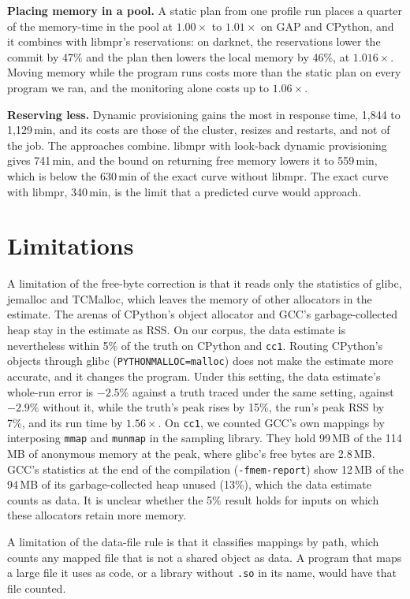 \documentclass[11pt]{article}
\begin{document}
\textbf{Placing memory in a pool.} A static plan from one profile run places a quarter of the memory-time in the pool
at $1.00\times$ to $1.01\times$ on GAP and CPython, and it combines with libmpr's reservations: on darknet, the
reservations lower the commit by 47\% and the plan then lowers the local memory by 46\%, at $1.016\times$. Moving
memory while the program runs costs more than the static plan on every program we ran, and the monitoring alone costs
up to $1.06\times$.

\textbf{Reserving less.} Dynamic provisioning gains the most in response time, 1{,}844 to 1{,}129\,min, and its
costs are those of the cluster, resizes and restarts, and not of the job. The approaches combine. libmpr with
look-back dynamic provisioning gives 741\,min, and the bound on returning free memory lowers it to 559\,min, which is
below the 630\,min of the exact curve without libmpr. The exact curve with libmpr, 340\,min, is the limit that a
predicted curve would approach.

\section{Limitations}
\label{sec:limits}

A limitation of the free-byte correction is that it reads only the statistics of glibc, jemalloc and TCMalloc, which
leaves the memory of other allocators in the estimate. The arenas of CPython's object allocator and GCC's
garbage-collected heap stay in the estimate as RSS. On our corpus, the data estimate is nevertheless within 5\% of the
truth on CPython and \texttt{cc1}. Routing CPython's objects through glibc (\texttt{PYTHONMALLOC=malloc}) does not make
the estimate more accurate, and it changes the program. Under this setting, the data estimate's whole-run error is
$-2.5\%$ against a truth traced under the same setting, against $-2.9\%$ without it, while the truth's peak rises by
15\%, the run's peak RSS by 7\%, and its run time by $1.56\times$. On \texttt{cc1}, we counted GCC's own mappings by
interposing \texttt{mmap} and \texttt{munmap} in the sampling library. They hold 99\,MB of the 114\,MB of anonymous
memory at the peak, where glibc's free bytes are 2.8\,MB. GCC's statistics at the end of the compilation
(\texttt{-fmem-report}) show 12\,MB of the 94\,MB of its garbage-collected heap unused (13\%), which the data estimate
counts as data. It is unclear whether the 5\% result holds for inputs on which these allocators retain more memory.

A limitation of the data-file rule is that it classifies mappings by path, which counts any mapped file that is not a
shared object as data. A program that maps a large file it uses as code, or a library without \texttt{.so} in its
name, would have that file counted.
\end{document}
